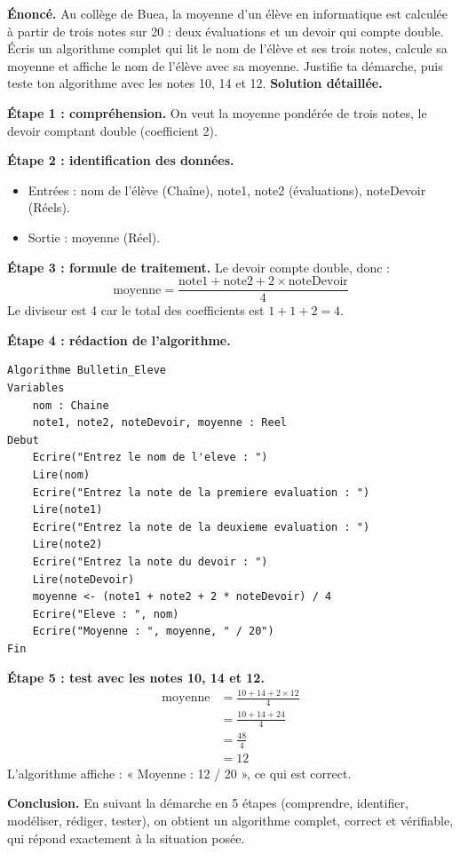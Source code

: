 \documentclass[11pt]{article}
\begin{document}
\begin{exoresolu}
\textbf{Énoncé.} Au collège de Buea, la moyenne d'un élève en informatique est calculée à partir de trois notes sur 20 : deux évaluations et un devoir qui compte double. Écris un algorithme complet qui lit le nom de l'élève et ses trois notes, calcule sa moyenne et affiche le nom de l'élève avec sa moyenne. Justifie ta démarche, puis teste ton algorithme avec les notes 10, 14 et 12.
\tcblower
\textbf{Solution détaillée.}

\textbf{Étape 1 : compréhension.} On veut la moyenne pondérée de trois notes, le devoir comptant double (coefficient 2).

\textbf{Étape 2 : identification des données.}
\begin{itemize}
  \item Entrées : nom de l'élève (Chaîne), note1, note2 (évaluations), noteDevoir (Réels).
  \item Sortie : moyenne (Réel).
\end{itemize}

\textbf{Étape 3 : formule de traitement.} Le devoir compte double, donc :
\[ \text{moyenne} = \frac{\text{note1} + \text{note2} + 2 \times \text{noteDevoir}}{4} \]
Le diviseur est 4 car le total des coefficients est $1 + 1 + 2 = 4$.

\textbf{Étape 4 : rédaction de l'algorithme.}
\begin{lstlisting}
Algorithme Bulletin_Eleve
Variables
    nom : Chaine
    note1, note2, noteDevoir, moyenne : Reel
Debut
    Ecrire("Entrez le nom de l'eleve : ")
    Lire(nom)
    Ecrire("Entrez la note de la premiere evaluation : ")
    Lire(note1)
    Ecrire("Entrez la note de la deuxieme evaluation : ")
    Lire(note2)
    Ecrire("Entrez la note du devoir : ")
    Lire(noteDevoir)
    moyenne <- (note1 + note2 + 2 * noteDevoir) / 4
    Ecrire("Eleve : ", nom)
    Ecrire("Moyenne : ", moyenne, " / 20")
Fin
\end{lstlisting}

\textbf{Étape 5 : test avec les notes 10, 14 et 12.}
\begin{align*}
\text{moyenne} &= \frac{10 + 14 + 2 \times 12}{4} \\
&= \frac{10 + 14 + 24}{4} \\
&= \frac{48}{4} \\
&= 12
\end{align*}
L'algorithme affiche : « Moyenne : 12 / 20 », ce qui est correct.

\textbf{Conclusion.} En suivant la démarche en 5 étapes (comprendre, identifier, modéliser, rédiger, tester), on obtient un algorithme complet, correct et vérifiable, qui répond exactement à la situation posée.
\end{exoresolu}
\end{document}
